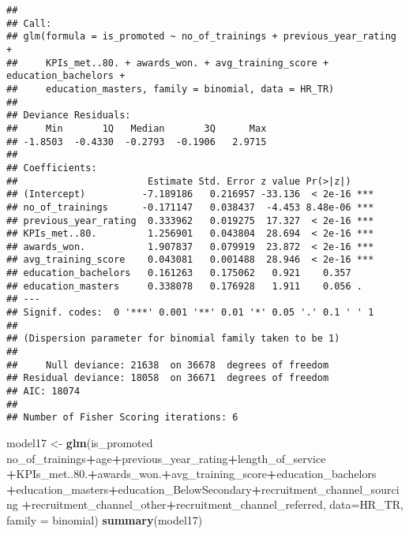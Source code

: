 \documentclass[
]{article}
\newenvironment{Shaded}{\begin{snugshade}}{\end{snugshade}}
\newcommand{\DataTypeTok}[1]{\textcolor[rgb]{0.13,0.29,0.53}{#1}}
\newcommand{\FloatTok}[1]{\textcolor[rgb]{0.00,0.00,0.81}{#1}}
\newcommand{\KeywordTok}[1]{\textcolor[rgb]{0.13,0.29,0.53}{\textbf{#1}}}
\newcommand{\NormalTok}[1]{#1}
\newcommand{\OperatorTok}[1]{\textcolor[rgb]{0.81,0.36,0.00}{\textbf{#1}}}
\newcommand{\StringTok}[1]{\textcolor[rgb]{0.31,0.60,0.02}{#1}}
\begin{document}
\begin{verbatim}
## 
## Call:
## glm(formula = is_promoted ~ no_of_trainings + previous_year_rating + 
##     KPIs_met..80. + awards_won. + avg_training_score + education_bachelors + 
##     education_masters, family = binomial, data = HR_TR)
## 
## Deviance Residuals: 
##     Min       1Q   Median       3Q      Max  
## -1.8503  -0.4330  -0.2793  -0.1906   2.9715  
## 
## Coefficients:
##                       Estimate Std. Error z value Pr(>|z|)    
## (Intercept)          -7.189186   0.216957 -33.136  < 2e-16 ***
## no_of_trainings      -0.171147   0.038437  -4.453 8.48e-06 ***
## previous_year_rating  0.333962   0.019275  17.327  < 2e-16 ***
## KPIs_met..80.         1.256901   0.043804  28.694  < 2e-16 ***
## awards_won.           1.907837   0.079919  23.872  < 2e-16 ***
## avg_training_score    0.043081   0.001488  28.946  < 2e-16 ***
## education_bachelors   0.161263   0.175062   0.921    0.357    
## education_masters     0.338078   0.176928   1.911    0.056 .  
## ---
## Signif. codes:  0 '***' 0.001 '**' 0.01 '*' 0.05 '.' 0.1 ' ' 1
## 
## (Dispersion parameter for binomial family taken to be 1)
## 
##     Null deviance: 21638  on 36678  degrees of freedom
## Residual deviance: 18058  on 36671  degrees of freedom
## AIC: 18074
## 
## Number of Fisher Scoring iterations: 6
\end{verbatim}

\begin{Shaded}
\begin{Highlighting}[]
\NormalTok{model17 <-}\StringTok{ }\KeywordTok{glm}\NormalTok{(is_promoted }\OperatorTok{~}\StringTok{ }\NormalTok{no_of_trainings}\OperatorTok{+}\NormalTok{age}\OperatorTok{+}\NormalTok{previous_year_rating}\OperatorTok{+}\NormalTok{length_of_service}
               \OperatorTok{+}\NormalTok{KPIs_met..}\FloatTok{80.}\OperatorTok{+}\NormalTok{awards_won.}\OperatorTok{+}\NormalTok{avg_training_score}\OperatorTok{+}\NormalTok{education_bachelors}
               \OperatorTok{+}\NormalTok{education_masters}\OperatorTok{+}\NormalTok{education_BelowSecondary}\OperatorTok{+}\NormalTok{recruitment_channel_sourcing}
               \OperatorTok{+}\NormalTok{recruitment_channel_other}\OperatorTok{+}\NormalTok{recruitment_channel_referred, }
               \DataTypeTok{data=}\NormalTok{HR_TR, }\DataTypeTok{family =}\NormalTok{ binomial)}
\KeywordTok{summary}\NormalTok{(model17)}
\end{Highlighting}
\end{Shaded}
\end{document}
